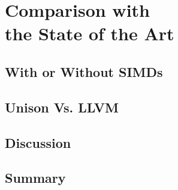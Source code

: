 %

\chapter[Comparison with the State of the Art]%
        {Comparison with\\ the State of the Art}

\section{With or Without SIMDs}
\section{Unison Vs. LLVM}
\section{Discussion}
\section{Summary}

